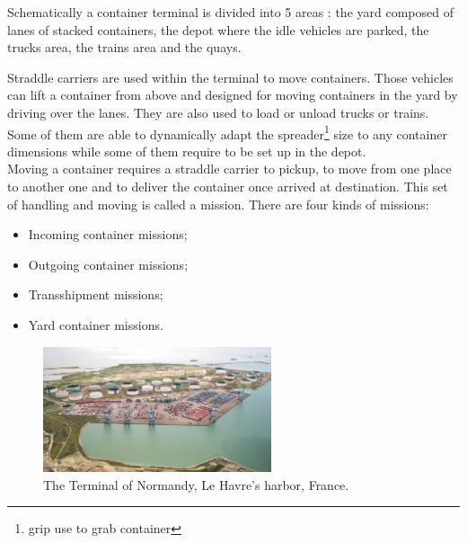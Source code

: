 \documentclass[a4paper,10pt]{article}
\begin{document}
Schematically a container terminal is divided into 5 areas : the yard composed of lanes of stacked containers, the depot where the idle vehicles are parked, the trucks area, the trains area and the quays.

Straddle carriers are used within the terminal to move containers. Those vehicles can lift a container from above and designed for moving containers in the yard by driving over the lanes. They are also used to load or unload trucks or trains. Some of them are able to dynamically adapt the spreader\footnote{grip use to grab container} size to any container dimensions while some of them require to be set up in the depot.\\%


Moving a container requires a straddle carrier to pickup, to move from one place to another one and to deliver the container once arrived at destination. This set of handling and moving is called a mission. There are four kinds of missions:
\begin{itemize}
	\item Incoming container missions;
	\item Outgoing container missions;
	\item Transshipment missions;
	\item Yard container missions.
\end{itemize}

\begin{figure}[ht]
  \begin{center}
  \includegraphics[width=0.6\textwidth]{Figures/terminalOfNormandy.png}
  \caption{The Terminal of Normandy, Le Havre's harbor, France.}
\end{center}
\end{figure}
\end{document}
